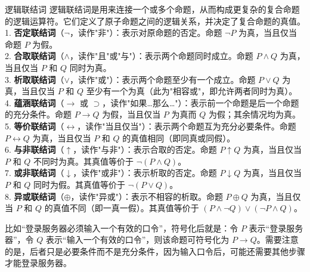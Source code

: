 \documentclass[lang=cn,11pt]{elegantbook}
\begin{document}
\begin{definition}{逻辑联结词}
    逻辑联结词是用来连接一个或多个命题，从而构成更复杂的复合命题的逻辑运算符。它们定义了原子命题之间的逻辑关系，并决定了复合命题的真值。\\
    1. \textbf{否定联结词}（$\neg$，读作"非"）：表示对原命题的否定。命题 $\neg P$ 为真，当且仅当命题 $P$ 为假。\\
    2. \textbf{合取联结词}（$\land$，读作"且"或"与"）：表示两个命题同时成立。命题 $P \land Q$ 为真，当且仅当 $P$ 和 $Q$ 同时为真。\\
    3. \textbf{析取联结词}（$\lor$，读作"或"）：表示两个命题至少有一个成立。命题 $P \lor Q$ 为真，当且仅当 $P$ 和 $Q$ 至少有一个为真（此为"相容或"，即允许两者同时为真）。\\
    4. \textbf{蕴涵联结词}（$\rightarrow$ 或 $\supset$，读作"如果…那么…"）：表示前一个命题是后一个命题的充分条件。命题 $P \rightarrow Q$ 为假，当且仅当 $P$ 为真而 $Q$ 为假；其余情况均为真。\\
    5. \textbf{等价联结词}（$\leftrightarrow$，读作"当且仅当"）：表示两个命题互为充分必要条件。命题 $P \leftrightarrow Q$ 为真，当且仅当 $P$ 和 $Q$ 的真值相同（即同真或同假）。\\
    6. \textbf{与非联结词}（$\uparrow$，读作"与非"）：表示合取的否定。命题 $P \uparrow Q$ 为真，当且仅当 $P$ 和 $Q$ 不同时为真。其真值等价于 $\neg(P \land Q)$。\\
    7. \textbf{或非联结词}（$\downarrow$，读作"或非"）：表示析取的否定。命题 $P \downarrow Q$ 为真，当且仅当 $P$ 和 $Q$ 同时为假。其真值等价于 $\neg(P \lor Q)$。\\
    8. \textbf{异或联结词}（$\oplus$，读作"异或"）：表示不相容的析取。命题 $P \oplus Q$ 为真，当且仅当 $P$ 和 $Q$ 的真值不同（即一真一假）。其真值等价于 $(P \land \neg Q) \lor (\neg P \land Q)$。
\end{definition}
比如“登录服务器必须输入一个有效的口令”，符号化后就是：令 $P$ 表示“登录服务器”，令 $Q$ 表示“输入一个有效的口令”，则该命题可符号化为 $P \rightarrow Q$。需要注意的是，后者只是必要条件而不是充分条件，因为输入口令后，可能还需要其他步骤才能登录服务器。
\end{document}
